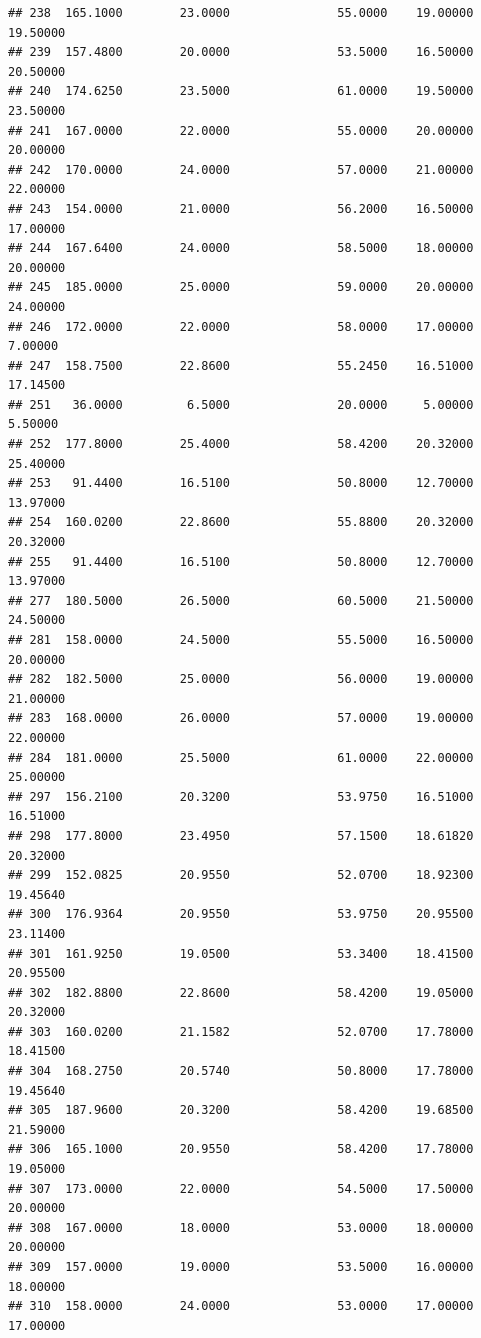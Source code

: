 \documentclass[]{article}
\begin{document}
\begin{verbatim}
## 238  165.1000        23.0000               55.0000    19.00000   19.50000
## 239  157.4800        20.0000               53.5000    16.50000   20.50000
## 240  174.6250        23.5000               61.0000    19.50000   23.50000
## 241  167.0000        22.0000               55.0000    20.00000   20.00000
## 242  170.0000        24.0000               57.0000    21.00000   22.00000
## 243  154.0000        21.0000               56.2000    16.50000   17.00000
## 244  167.6400        24.0000               58.5000    18.00000   20.00000
## 245  185.0000        25.0000               59.0000    20.00000   24.00000
## 246  172.0000        22.0000               58.0000    17.00000    7.00000
## 247  158.7500        22.8600               55.2450    16.51000   17.14500
## 251   36.0000         6.5000               20.0000     5.00000    5.50000
## 252  177.8000        25.4000               58.4200    20.32000   25.40000
## 253   91.4400        16.5100               50.8000    12.70000   13.97000
## 254  160.0200        22.8600               55.8800    20.32000   20.32000
## 255   91.4400        16.5100               50.8000    12.70000   13.97000
## 277  180.5000        26.5000               60.5000    21.50000   24.50000
## 281  158.0000        24.5000               55.5000    16.50000   20.00000
## 282  182.5000        25.0000               56.0000    19.00000   21.00000
## 283  168.0000        26.0000               57.0000    19.00000   22.00000
## 284  181.0000        25.5000               61.0000    22.00000   25.00000
## 297  156.2100        20.3200               53.9750    16.51000   16.51000
## 298  177.8000        23.4950               57.1500    18.61820   20.32000
## 299  152.0825        20.9550               52.0700    18.92300   19.45640
## 300  176.9364        20.9550               53.9750    20.95500   23.11400
## 301  161.9250        19.0500               53.3400    18.41500   20.95500
## 302  182.8800        22.8600               58.4200    19.05000   20.32000
## 303  160.0200        21.1582               52.0700    17.78000   18.41500
## 304  168.2750        20.5740               50.8000    17.78000   19.45640
## 305  187.9600        20.3200               58.4200    19.68500   21.59000
## 306  165.1000        20.9550               58.4200    17.78000   19.05000
## 307  173.0000        22.0000               54.5000    17.50000   20.00000
## 308  167.0000        18.0000               53.0000    18.00000   20.00000
## 309  157.0000        19.0000               53.5000    16.00000   18.00000
## 310  158.0000        24.0000               53.0000    17.00000   17.00000

\end{verbatim}
\end{document}
